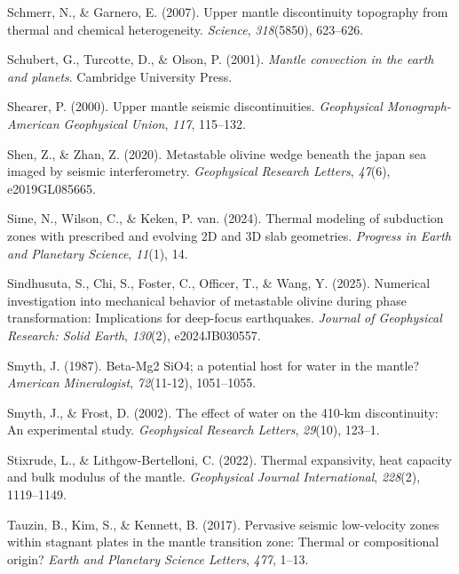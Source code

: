 \documentclass[draft,linenumbers]{agujournal2019}
\newlength{\cslhangindent}
\newenvironment{CSLReferences}[2]
 {\begin{list}{}{
  \setlength{\itemindent}{0pt}
  \setlength{\leftmargin}{0pt}
  \setlength{\parsep}{0pt}
  \ifodd #1
   \setlength{\leftmargin}{\cslhangindent}
   \setlength{\itemindent}{-\cslhangindent}
  \fi
  \setlength{\itemsep}{#2\baselineskip}
  }
  \item\relax}
 {\end{list}}
\begin{document}
\begin{CSLReferences}{1}{0}
Schmerr, N., \& Garnero, E. (2007). Upper mantle discontinuity
topography from thermal and chemical heterogeneity. \emph{Science},
\emph{318}(5850), 623--626.

Schubert, G., Turcotte, D., \& Olson, P. (2001). \emph{Mantle convection
in the earth and planets}. Cambridge University Press.

Shearer, P. (2000). Upper mantle seismic discontinuities.
\emph{Geophysical Monograph-American Geophysical Union}, \emph{117},
115--132.

Shen, Z., \& Zhan, Z. (2020). Metastable olivine wedge beneath the japan
sea imaged by seismic interferometry. \emph{Geophysical Research
Letters}, \emph{47}(6), e2019GL085665.

Sime, N., Wilson, C., \& Keken, P. van. (2024). Thermal modeling of
subduction zones with prescribed and evolving 2D and 3D slab geometries.
\emph{Progress in Earth and Planetary Science}, \emph{11}(1), 14.

Sindhusuta, S., Chi, S., Foster, C., Officer, T., \& Wang, Y. (2025).
Numerical investigation into mechanical behavior of metastable olivine
during phase transformation: Implications for deep-focus earthquakes.
\emph{Journal of Geophysical Research: Solid Earth}, \emph{130}(2),
e2024JB030557.

Smyth, J. (1987). Beta-Mg2 SiO4; a potential host for water in the
mantle? \emph{American Mineralogist}, \emph{72}(11-12), 1051--1055.

Smyth, J., \& Frost, D. (2002). The effect of water on the 410-km
discontinuity: An experimental study. \emph{Geophysical Research
Letters}, \emph{29}(10), 123--1.

Stixrude, L., \& Lithgow-Bertelloni, C. (2022). Thermal expansivity,
heat capacity and bulk modulus of the mantle. \emph{Geophysical Journal
International}, \emph{228}(2), 1119--1149.

Tauzin, B., Kim, S., \& Kennett, B. (2017). Pervasive seismic
low-velocity zones within stagnant plates in the mantle transition zone:
Thermal or compositional origin? \emph{Earth and Planetary Science
Letters}, \emph{477}, 1--13.


\end{CSLReferences}
\end{document}
